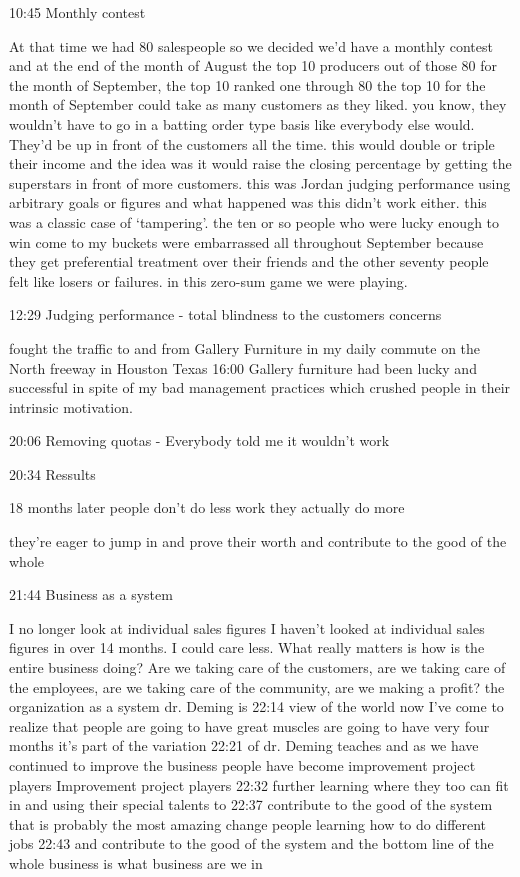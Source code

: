 \documentclass[
]{book}
\begin{document}
10:45 Monthly contest

At that time we had 80 salespeople so we decided we'd have a monthly contest and at the end of the month of August the top 10 producers out of those 80 for the month of September, the top 10 ranked one through 80 the top 10 for the month of September could take as many customers as they liked. you know, they wouldn't have to go in a batting order type basis like everybody else would. They'd be up in front of the customers all the time. this would double or triple their income and the idea was it would raise the closing percentage by getting the superstars in front of more customers. this was Jordan judging performance using arbitrary goals or figures and what happened was this didn't work either. this was a classic case of `tampering'. the ten or so people who were lucky enough to win come to my buckets were embarrassed all throughout September because they get preferential treatment over their friends and the other seventy people felt like losers or failures. in this zero-sum game we were playing.

12:29 Judging performance - total blindness to the customers concerns

fought the traffic to and from Gallery Furniture in my daily commute on the North freeway in Houston Texas
16:00 Gallery furniture had been lucky and successful in spite of my bad management practices which crushed people in their intrinsic motivation.

20:06 Removing quotas - Everybody told me it wouldn't work

20:34 Ressults

18 months later people don't do less work they actually do more

they're eager to jump in and prove their worth and contribute to the good of the whole

21:44 Business as a system

I no longer look at individual sales figures I haven't looked at individual sales figures in over 14 months. I could care less. What really matters is how is the entire business doing? Are we taking care of the customers, are we taking care of the employees, are we taking care of the community, are we making a profit? the organization as a system dr. Deming is
22:14
view of the world now I've come to realize that people are going to have great muscles are going to have very four months it's part of the variation
22:21
of dr. Deming teaches and as we have continued to improve the business people have become improvement project players
Improvement project players
22:32
further learning where they too can fit in and using their special talents to
22:37
contribute to the good of the system that is probably the most amazing change people learning how to do different jobs
22:43
and contribute to the good of the system and the bottom line of the whole business is what business are we in
\end{document}
